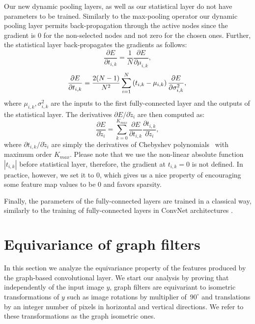 \documentclass[10pt,journal,compsoc]{IEEEtran}
\begin{document}
	Our new dynamic pooling layers, as well as our statistical layer do not have parameters to be trained. Similarly to the max-pooling operator our dynamic pooling layer  permits back-propagation through the active nodes since the gradient is 0 for the non-selected nodes and not zero for the chosen ones.  
	Further, the statistical layer back-propagates the gradients as follows:
	\begin{equation}
	\frac{\partial{E}} {\partial t_{i, k}}  =\frac{1}{N} \frac{\partial{E}}{\partial \mu_{i,k}},
	\label{eq:der_stat1}
	\end{equation}
	\begin{equation}
	\frac{\partial{E}} {\partial t_{i, k}}  = \frac{2 (N-1)}{N^2} \sum_{i=1}^N \left( t_{i, k} - \mu_{i,k} \right) \frac{\partial E}{\partial \sigma^2_{i, k}},\\
	\label{eq:der_stat2}
	\end{equation}
	\noindent
	where $\mu_{i,k}, \sigma^2_{i,k}$ are the inputs to the first fully-connected layer and the outputs of the statistical layer. The derivatives $\partial E / \partial \tilde{z}_i$ are then computed as:
	\begin{equation}
	\frac{\partial E}{\partial \tilde{z}_i} = \sum_{k=0}^{K_{max}}\frac{\partial E}{\partial t_{i,k}} \frac{\partial t_{i,k}}{\partial \tilde{z}_i},
	\end{equation}
	\noindent
	where $\partial t_{i,k} / \partial \tilde{z}_i$ are simply the derivatives of Chebyshev polynomials~\cite{bb:shuman2011chebyshev} with maximum order $K_{max}$. Please note that we use the non-linear absolute function $|t_{i,k}|$ before statistical layer, therefore, the gradient at $t_{i,k}=0$ is not defined. In practice, however, we set it to $0$, which gives us a nice property of encouraging some  feature map values to be $0$ and favors sparsity.
	
	Finally, the parameters of the fully-connected layers are trained in a classical way, similarly to the training of fully-connected layers in ConvNet architectures \cite{bb:rumelhart1988learning}. %
	
	\section{Equivariance of graph filters}
	\label{s:equivaricance}
	
	In this section we analyze the equivariance property of the features produced by the graph-based convolutional layer. We start our analysis by proving that independently of the input image $y$, graph filters are equivariant to isometric transformations of $y$ such as image rotations by multiplier of $90^\circ$ and translations by an integer number of pixels in horizontal and vertical directions. We refer to these transformations as the graph isometric ones.
	
\end{document}
